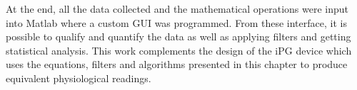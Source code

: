 At the end, all the data collected and the mathematical operations were input into Matlab where a custom GUI was programmed. From these interface, it is possible to qualify and quantify the data as well as applying filters and getting statistical analysis. This work complements the design of the iPG device which uses the equations, filters and algorithms presented in this chapter to produce equivalent physiological readings.


%
%
%
%
%
